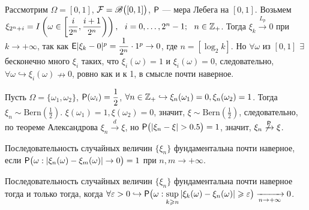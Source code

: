 \begin{example}
	Рассмотрим $\Omega = [0, 1]$, $\F = \B\big([0,1] \big)$, $\P$ --- мера Лебега на $[0, 1]$. 
	Возьмем $\xi_{2^n + i} = I \left( \omega \in \left[ \dfrac{i}{2^n}, \dfrac{i + 1}{2^n} \right) \right), ~~i = 0,\ldots, 2^n - 1;~~n \in \Z_+$. 
	Тогда $\xi_k \xrightarrow{L_p} 0$ при $k \rightarrow + \infty$, так как $\E | \xi_k  - 0 |^p = \dfrac{1}{2^n} \cdot 1^p \rightarrow 0$, где $n = \left[ \log_2 k \right]$. 
	Но $\forall \omega$ из $[0,1]$ $\exists$ бесконечно много $\xi_i$ таких, что $\xi_i(\omega) = 1$ и $\xi_i(\omega) = 0$, следовательно, $\forall \omega \hookrightarrow \xi_i(\omega) \nrightarrow 0$, ровно как и к 1, в смысле почти наверное.
\end{example}

\begin{example} 
	Пусть $\Omega = \{ \omega_1, \omega_2 \}$, $\P(\omega_i) = \dfrac{1}{2}$, $\forall n \in \Z_+ \hookrightarrow \xi_n(\omega_1) = 0, \xi_n(\omega_2) = 1$. Тогда $\xi_n \sim \text{Bern} \left( \frac{1}{2} \right)$. $\xi(\omega_1) = 1, \xi(\omega_2) = 0$, значит, $\xi \sim \text{Bern} \left( \frac{1}{2} \right)$, следовательно, по теореме Александрова $\xi_n \xrightarrow{d} \xi$, но $\P \big( | \xi_n - \xi| > 0.5 \big) = 1$, значит, $\xi_n \not\xrightarrow{\P} \xi$. 
\end{example}

\begin{definition}
    Последовательность случайных величин $\{ \xi_n \}$ фундаментальна почти наверное, если $\P  \big( \omega : | \xi_n(\omega) - \xi_m(\omega) | \rightarrow 0 \big) = 1$ при $n, m \rightarrow + \infty$.
\end{definition}

\begin{lemma}
	Последовательность случайных величин $\{ \xi_n \}$ фундаментальна почти наверное тогда и только тогда, когда $\forall \varepsilon > 0 \hookrightarrow \P\big(\omega: \sup\limits_{k \geqslant n} | \xi_k(\omega) - \xi_n(\omega) | \geqslant \varepsilon \big) \limn 0$.
\end{lemma}

